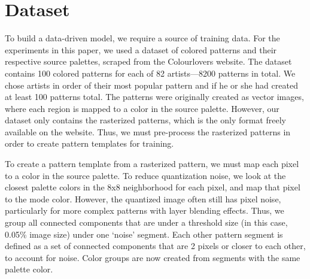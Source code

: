 \section{Dataset}
\label{sec:dataset}

To build a data-driven model, we require a source of training data. For the experiments in this paper, we used a dataset of colored patterns and their respective source palettes, scraped from the Colourlovers website. The dataset contains 100 colored patterns for each of 82 artists---8200 patterns in total. We chose artists in order of their most popular pattern and if he or she had created at least 100 patterns total. The patterns were originally created as vector images, where each region is mapped to a color in the source palette. However, our dataset only contains the rasterized patterns, which is the only format freely available on the website. Thus, we must pre-process the rasterized patterns in order to create pattern templates for training.

To create a pattern template from a rasterized pattern, we must map each pixel to a color in the source palette. To reduce quantization noise, we look at the closest palette colors in the 8x8 neighborhood for each pixel, and map that pixel to the mode color. However, the quantized image often still has pixel noise, particularly for more complex patterns with layer blending effects. Thus, we group all connected components that are under a threshold size (in this case, 0.05\% image size) under one `noise' segment. Each other pattern segment is defined as a set of connected components that are 2 pixels or closer to each other, to account for noise. Color groups are now created from segments with the same palette color.


